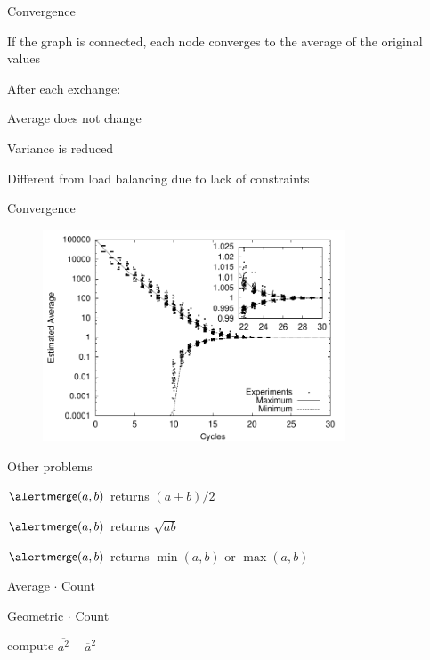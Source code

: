 \begin{frame}{Convergence}
	
\BIL
\item If the graph is connected, each node converges to the average of the original values
\item After each exchange:
	\BI
	\item Average does not change
	\item Variance is reduced
	\EI
\item Different from load balancing due to lack of constraints
\EIL

\end{frame}

\begin{frame}{Convergence}
	
\begin{figure}
	\includegraphics[width=0.80\textwidth]{average}
\end{figure}	
	
\end{frame}

\begin{frame}{Other problems}

\BIL
\item {}	$\Merge(a,b)$ returns $(a+b)/2$
\item {}	$\Merge(a,b)$ returns $\sqrt{ab}$
\item {}	$\Merge(a,b)$ returns $\min(a,b)$ or $\max(a,b)$
\item {}	Average $\cdot$ \alert{Count}
\item {}	Geometric $\cdot$ \alert{Count}
\item {}	compute $\overline{a^2} - \overline{a}^2$
\EIL

\end{frame}

